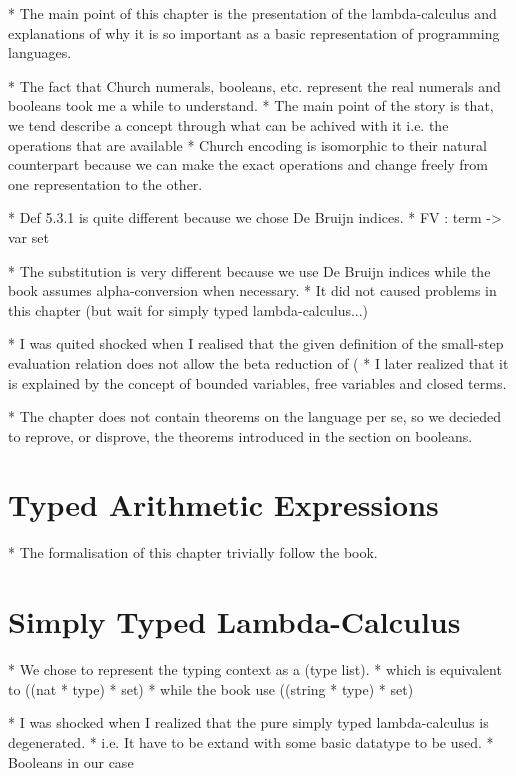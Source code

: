 \documentclass[a4paper, oneside, 12pt, titlepage]{article}
\begin{document}
  * The main point of this chapter is the presentation of the lambda-calculus and explanations of
    why it is so important as a basic representation of programming languages.

  * The fact that Church numerals, booleans, etc. represent the real numerals and booleans took me a
    while to understand.
    * The main point of the story is that, we tend describe a concept through what can be achived
      with it i.e. the operations that are available
    * Church encoding is isomorphic to their natural counterpart because we can make the exact
      operations and change freely from one representation to the other.

  * Def 5.3.1 is quite different because we chose De Bruijn indices.
    * FV : term -> var set

  * The substitution is very different because we use De Bruijn indices while the book assumes
    alpha-conversion when necessary.
    * It did not caused problems in this chapter (but wait for simply typed lambda-calculus...)

  * I was quited shocked when I realised that the given definition of the small-step evaluation
    relation does not allow the beta reduction of (%
    * I later realized that it is explained by the concept of bounded variables, free variables and
      closed terms.

  * The chapter does not contain theorems on the language per se, so we decieded to reprove, or
    disprove, the theorems introduced in the section on booleans.

\section{Typed Arithmetic Expressions}
\label{sec:typed-arith-expr}

  * The formalisation of this chapter trivially follow the book.

\section{Simply Typed Lambda-Calculus}
\label{sec:simply-typed-lambda-calculus}

  * We chose to represent the typing context as a (type list).
    * which is equivalent to ((nat * type) * set)
    * while the book use ((string * type) * set)

  * I was shocked when I realized that the pure simply typed lambda-calculus is degenerated.
    * i.e. It have to be extand with some basic datatype to be used.
    * Booleans in our case
\end{document}
